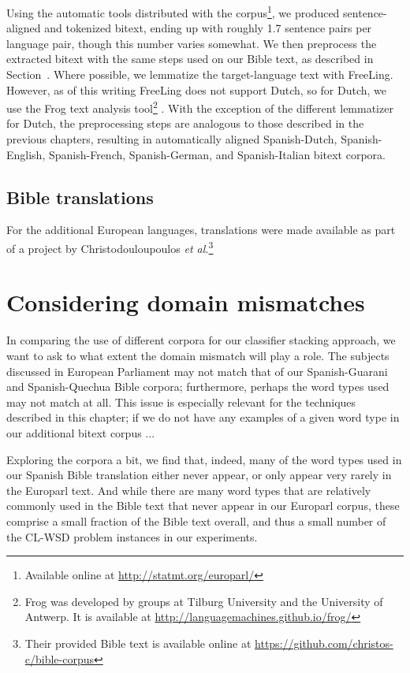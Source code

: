 Using the automatic tools distributed with the corpus\footnote{Available
online at \url{http://statmt.org/europarl/}}, we produced sentence-aligned
and tokenized bitext, ending up with roughly 1.7 sentence pairs per language
pair, though this number varies somewhat.
We then preprocess the extracted bitext with the same steps used on our Bible
text, as described in Section~\label{sec:datasetsandpreprocessing}. Where
possible, we lemmatize the target-language text with FreeLing. However, as of
this writing FreeLing does not support Dutch, so for Dutch, we use the Frog
text analysis tool\footnote{Frog was developed by groups at Tilburg University
and the University of Antwerp. It is available at
\url{http://languagemachines.github.io/frog/}} \cite{tadpole2007}. With the
exception of the different lemmatizer for Dutch, the preprocessing steps are
analogous to those described in the previous chapters, resulting in
automatically aligned Spanish-Dutch, Spanish-English, Spanish-French,
Spanish-German, and Spanish-Italian bitext corpora.

\subsection{Bible translations}

For the additional European languages, translations were made available as part
of a project by Christodouloupoulos \emph{et
al.}\cite{Christodouloupoulos2015}\footnote{Their provided Bible text is
available online at \url{https://github.com/christos-c/bible-corpus}}


\section{Considering domain mismatches}
In comparing the use of different corpora for our classifier stacking approach,
we want to ask to what extent the domain mismatch will play a role.
The subjects discussed in European Parliament may not match that of our
Spanish-Guarani and Spanish-Quechua Bible corpora; furthermore, perhaps the
word types used may not match at all. This issue is especially relevant for the
techniques described in this chapter; if we do not have any examples of a given
word type in our additional bitext corpus ...


Exploring the corpora a bit, we find that, indeed, many of the word types used
in our Spanish Bible translation either never appear, or only appear very
rarely in the Europarl text. And while there are many word types that are
relatively commonly used in the Bible text that never appear in our Europarl
corpus, these comprise a small fraction of the Bible text overall, and thus a
small number of the CL-WSD problem instances in our experiments.

